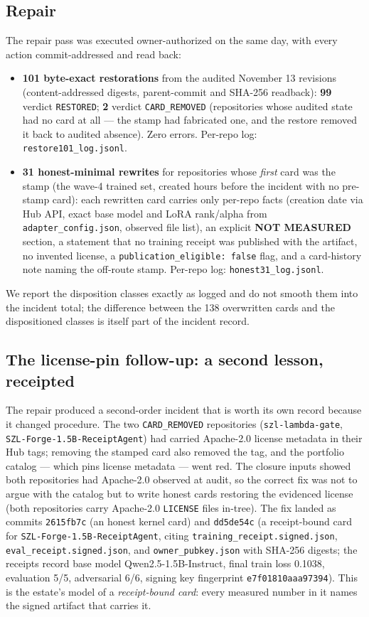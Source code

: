 ﻿\documentclass[11pt]{article}
\begin{document}
\subsection{Repair}
The repair pass was executed owner-authorized on the same day, with every action commit-addressed and read back:
\begin{itemize}
\item \textbf{101 byte-exact restorations} from the audited November 13 revisions (content-addressed digests, parent-commit and SHA-256 readback): \textbf{99} verdict \texttt{RESTORED}; \textbf{2} verdict \texttt{CARD\_REMOVED} (repositories whose audited state had no card at all --- the stamp had fabricated one, and the restore removed it back to audited absence). Zero errors. Per-repo log: \texttt{restore101\_log.jsonl}.
\item \textbf{31 honest-minimal rewrites} for repositories whose \emph{first} card was the stamp (the wave-4 trained set, created hours before the incident with no pre-stamp card): each rewritten card carries only per-repo facts (creation date via Hub API, exact base model and LoRA rank/alpha from \texttt{adapter\_config.json}, observed file list), an explicit \textbf{NOT MEASURED} section, a statement that no training receipt was published with the artifact, no invented license, a \texttt{publication\_eligible: false} flag, and a card-history note naming the off-route stamp. Per-repo log: \texttt{honest31\_log.jsonl}.
\end{itemize}
We report the disposition classes exactly as logged and do not smooth them into the incident total; the difference between the 138 overwritten cards and the dispositioned classes is itself part of the incident record.

\subsection{The license-pin follow-up: a second lesson, receipted}
The repair produced a second-order incident that is worth its own record because it changed procedure. The two \texttt{CARD\_REMOVED} repositories (\texttt{szl-lambda-gate}, \texttt{SZL-Forge-1.5B-ReceiptAgent}) had carried Apache-2.0 license metadata in their Hub tags; removing the stamped card also removed the tag, and the portfolio catalog --- which pins license metadata --- went red. The closure inputs showed both repositories had Apache-2.0 observed at audit, so the correct fix was not to argue with the catalog but to write honest cards restoring the evidenced license (both repositories carry Apache-2.0 \texttt{LICENSE} files in-tree). The fix landed as commits \texttt{2615fb7c} (an honest kernel card) and \texttt{dd5de54c} (a receipt-bound card for \texttt{SZL-Forge-1.5B-ReceiptAgent}, citing \texttt{training\_receipt.signed.json}, \texttt{eval\_receipt.signed.json}, and \texttt{owner\_pubkey.json} with SHA-256 digests; the receipts record base model Qwen2.5-1.5B-Instruct, final train loss 0.1038, evaluation 5/5, adversarial 6/6, signing key fingerprint \texttt{e7f01810aaa97394}). This is the estate's model of a \emph{receipt-bound card}: every measured number in it names the signed artifact that carries it.
\end{document}
